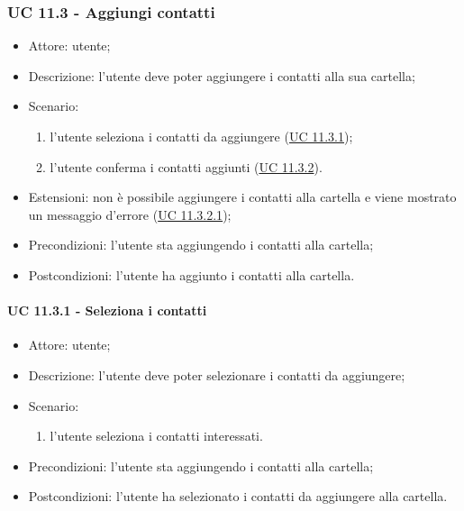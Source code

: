     \subsubsection{UC 11.3 - Aggiungi contatti} \label{sec: UC 11.3}
    \begin{itemize}
        \item Attore: utente;
        \item Descrizione: l'utente deve poter aggiungere i contatti alla sua cartella;
        \item Scenario:
        \begin{enumerate}
        \item l'utente seleziona i contatti da aggiungere (\hyperref[sec: UC 11.3.1]{UC 11.3.1});
        \item l'utente conferma i contatti aggiunti (\hyperref[sec: UC 11.3.2]{UC 11.3.2}).
        \end{enumerate}
        \item Estensioni: non è possibile aggiungere i contatti alla cartella e viene mostrato un messaggio d'errore (\hyperref[sec: UC 11.3.2.1]{UC 11.3.2.1});
        \item Precondizioni: l'utente sta aggiungendo i contatti alla cartella;
        \item Postcondizioni: l'utente ha aggiunto i contatti alla cartella.
    \end{itemize}
    \paragraph{UC 11.3.1 - Seleziona i contatti} \label{sec: UC 11.3.1}
        \begin{itemize}
            \item Attore: utente;
            \item Descrizione: l'utente deve poter selezionare i contatti da aggiungere;
            \item Scenario:
            \begin{enumerate}
                \item l'utente seleziona i contatti interessati.
            \end{enumerate}
        \item Precondizioni: l'utente sta aggiungendo i contatti alla cartella;
        \item Postcondizioni: l'utente ha selezionato i contatti da aggiungere alla cartella.
    \end{itemize}
